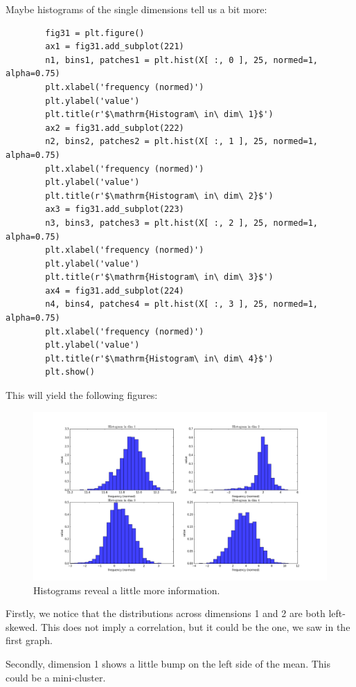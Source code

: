 Maybe histograms of the single dimensions tell us a bit more:

\begin{verbatim}
        fig31 = plt.figure()
        ax1 = fig31.add_subplot(221)
        n1, bins1, patches1 = plt.hist(X[ :, 0 ], 25, normed=1, alpha=0.75)
        plt.xlabel('frequency (normed)')
        plt.ylabel('value')
        plt.title(r'$\mathrm{Histogram\ in\ dim\ 1}$')
        ax2 = fig31.add_subplot(222)
        n2, bins2, patches2 = plt.hist(X[ :, 1 ], 25, normed=1, alpha=0.75)
        plt.xlabel('frequency (normed)')
        plt.ylabel('value')
        plt.title(r'$\mathrm{Histogram\ in\ dim\ 2}$')
        ax3 = fig31.add_subplot(223)
        n3, bins3, patches3 = plt.hist(X[ :, 2 ], 25, normed=1, alpha=0.75)
        plt.xlabel('frequency (normed)')
        plt.ylabel('value')
        plt.title(r'$\mathrm{Histogram\ in\ dim\ 3}$')
        ax4 = fig31.add_subplot(224)
        n4, bins4, patches4 = plt.hist(X[ :, 3 ], 25, normed=1, alpha=0.75)
        plt.xlabel('frequency (normed)')
        plt.ylabel('value')
        plt.title(r'$\mathrm{Histogram\ in\ dim\ 4}$')
        plt.show()
\end{verbatim}

This will yield the following figures:
\begin{figure}[H]
	\centering \includegraphics{../Figures/Ex3_1_hists.png}
	\caption{Histograms reveal a little more information.}
	\label{fig:3hist}
\end{figure}

Firstly, we notice that the distributions across dimensions 1 and 2 are both left-skewed. 
This does not imply a correlation, but it could be the one, we saw in the first graph.

Secondly, dimension 1 shows a little bump on the left side of the mean. This could be a mini-cluster.

